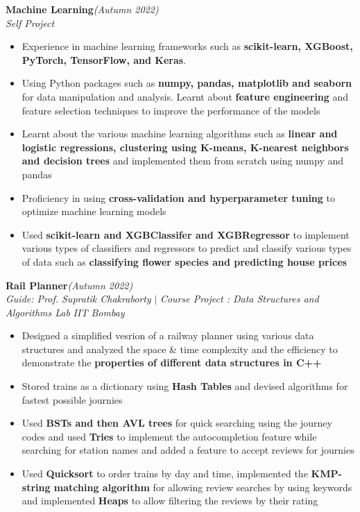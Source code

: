 \documentclass[a4paper,10pt]{article}
\begin{document}
\pagebreak
\vspace{\baselineskip}
\vspace{-20pt}
\noindent\textbf{\large Machine Learning}\hfill{\sl \small (Autumn 2022)}\\
{\it Self Project}
\\\vspace{-15pt}
\begin{itemize}[itemsep = -0.65 mm, leftmargin=*]
    \item Experience in machine learning frameworks such as \textbf{scikit-learn, XGBoost, PyTorch, TensorFlow, and Keras}.
    \item Using Python packages such as \textbf{numpy, pandas, matplotlib and seaborn} for data manipulation and analysis. Learnt about \textbf{feature engineering} and feature selection techniques to improve the performance of the models
    \item Learnt about the various machine learning algorithms such as \textbf{linear and logistic regressions, clustering using K-means, K-nearest neighbors and decision trees} and implemented them from scratch using numpy and pandas
    \item Proficiency in using \textbf{cross-validation and hyperparameter tuning} to optimize machine learning models
    \item Used \textbf{scikit-learn and XGBClassifer and XGBRegressor} to implement various types of classifiers and regressors to predict and classify various types of data such as \textbf{classifying flower species and predicting house prices}
\end{itemize}
\vspace{\baselineskip}
\vspace{-15pt}
\noindent\textbf{\large Rail Planner}\hfill{\sl \small (Autumn 2022)}\\
{\it Guide: Prof. Supratik Chakraborty} $|$ {\it Course Project : Data Structures and Algorithms Lab} \hfill{\it IIT Bombay}
\\\vspace{-15pt}
\begin{itemize}[itemsep = -0.65 mm, leftmargin=*]
    \item Designed a simplified vesrion of a railway planner using various data structures and analyzed the space \& time complexity and the efficiency to demonstrate the \textbf{properties of different data structures in C++}
    \item Stored trains as a dictionary using \textbf{Hash Tables} and devised algorithms for fastest possible journies
    \item Used \textbf{BSTs and then AVL trees} for quick searching using the journey codes and used \textbf{Tries} to implement the autocompletion feature while searching for station names and added a feature to accept reviews for journies
    \item Used \textbf{Quicksort} to order trains by day and time, implemented the \textbf{KMP-string matching algorithm} for allowing review searches by using keywords and implemented \textbf{Heaps} to allow filtering the reviews by their rating
\end{itemize}
\end{document}
